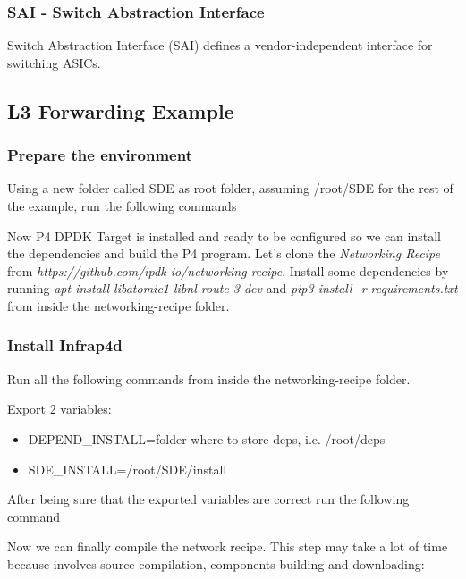 \documentclass[../sn.tex]{subfiles}
\begin{document}
\subsubsection*{SAI - Switch Abstraction Interface}
Switch Abstraction Interface (SAI) defines a vendor-independent interface for switching ASICs.

\subsection{L3 Forwarding Example}
\subsubsection*{Prepare the environment}
Using a new folder called SDE as root folder, assuming /root/SDE for the rest of the example, run the following commands

Now P4 DPDK Target is installed and ready to be configured so we can install the dependencies and build the P4 program.
Let's clone the \emph{Networking Recipe} from \emph{https://github.com/ipdk-io/networking-recipe}. Install some dependencies by running \emph{apt install libatomic1 libnl-route-3-dev} and \emph{pip3 install -r requirements.txt} from inside the networking-recipe folder.

\subsubsection*{Install Infrap4d}
Run all the following commands from inside the networking-recipe folder.

Export 2 variables:
\begin{itemize}
    \item DEPEND\_INSTALL=folder where to store deps, i.e. /root/deps
    \item SDE\_INSTALL=/root/SDE/install
\end{itemize}
After being sure that the exported variables are correct run the following command

Now we can finally compile the network recipe. This step may take a lot of time because involves source compilation, components building and downloading:
\end{document}
